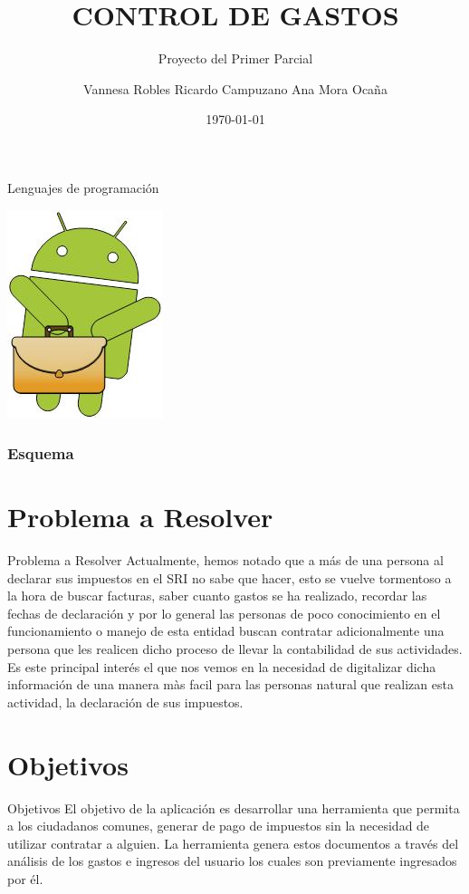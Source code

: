 \documentclass[utf8]{beamer}
\title{CONTROL DE GASTOS}
\subtitle {Proyecto del Primer Parcial}
\author{Vannesa Robles  Ricardo Campuzano  Ana Mora Ocaña}
\date{\today}
\institute {ESPOL}
\begin{document}
\begin{frame}[plain]{Lenguajes de programación}
\begin{center}
\includegraphics [width = 0.2 \textwidth]{logo.jpg} %
\end{center}
\titlepage
\end{frame}

\begin{frame}
\frametitle{Esquema} %
\tableofcontents[pausesections]
\end{frame}

\section{Problema a Resolver}
\begin{frame}[allowframebreaks]

\begin{block}{Problema a Resolver }
Actualmente,  hemos notado que a más de una persona al declarar sus impuestos en el SRI no sabe que hacer, esto se vuelve tormentoso a la hora de buscar facturas, saber cuanto gastos se ha realizado, recordar las fechas de declaración y por lo general las personas de poco conocimiento en el funcionamiento o manejo de esta entidad buscan contratar adicionalmente una persona que les realicen dicho proceso de llevar la contabilidad de sus actividades. Es este principal interés el que nos vemos en la necesidad de digitalizar dicha información de una manera màs facil para las personas natural que realizan esta actividad, la declaración de sus impuestos.
\end {block}
\end{frame}

\section{Objetivos}
\begin{frame}[allowframebreaks]

\begin{block}{Objetivos}
El objetivo de la aplicación  es desarrollar una herramienta que permita a los ciudadanos comunes, generar de pago de impuestos sin la necesidad de utilizar contratar a alguien. La herramienta genera estos documentos a través del análisis de los gastos e ingresos del usuario los cuales son previamente ingresados por él.
\end {block}
\end{frame}
\end{document}
